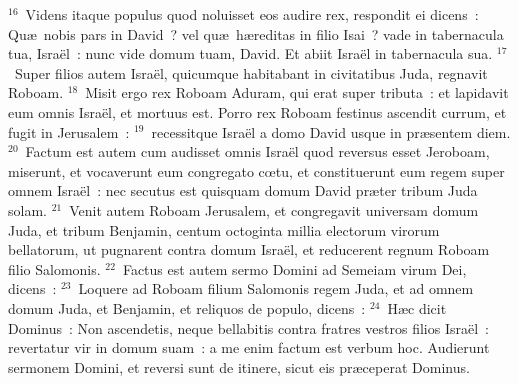 ${}^{16}$~Videns itaque populus quod noluisset eos audire rex, respondit ei dicens~: Qu\ae\ nobis pars in David~? vel qu\ae\ h\ae reditas in filio Isai~? vade in tabernacula tua, Isra\"el~: nunc vide domum tuam, David. Et abiit Isra\"el in tabernacula sua.
${}^{17}$~Super filios autem Isra\"el, quicumque habitabant in civitatibus Juda, regnavit Roboam.
${}^{18}$~Misit ergo rex Roboam Aduram, qui erat super tributa~: et lapidavit eum omnis Isra\"el, et mortuus est. Porro rex Roboam festinus ascendit currum, et fugit in Jerusalem~:
${}^{19}$~recessitque Isra\"el a domo David usque in pr\ae sentem diem.
${}^{20}$~Factum est autem cum audisset omnis Isra\"el quod reversus esset Jeroboam, miserunt, et vocaverunt eum congregato cœtu, et constituerunt eum regem super omnem Isra\"el~: nec secutus est quisquam domum David pr\ae ter tribum Juda solam.
${}^{21}$~Venit autem Roboam Jerusalem, et congregavit universam domum Juda, et tribum Benjamin, centum octoginta millia electorum virorum bellatorum, ut pugnarent contra domum Isra\"el, et reducerent regnum Roboam filio Salomonis.
${}^{22}$~Factus est autem sermo Domini ad Semeiam virum Dei, dicens~:
${}^{23}$~Loquere ad Roboam filium Salomonis regem Juda, et ad omnem domum Juda, et Benjamin, et reliquos de populo, dicens~:
${}^{24}$~H\ae c dicit Dominus~: Non ascendetis, neque bellabitis contra fratres vestros filios Isra\"el~: revertatur vir in domum suam~: a me enim factum est verbum hoc. Audierunt sermonem Domini, et reversi sunt de itinere, sicut eis pr\ae ceperat Dominus.


